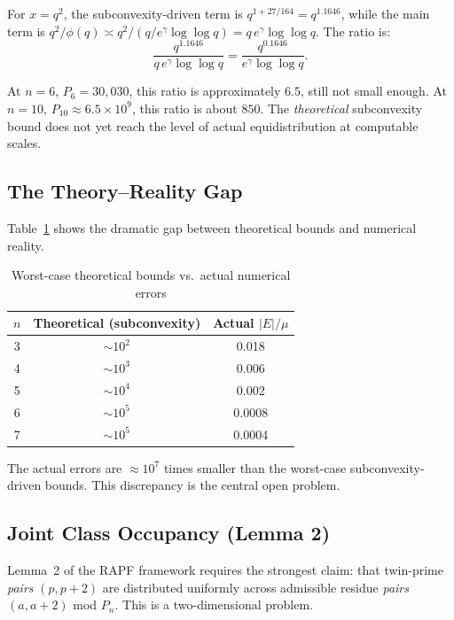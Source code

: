\documentclass[11pt]{article}
\begin{document}
For $x = q^2$, the subconvexity-driven term is $q^{1 + 27/164} = q^{1.1646}$,
while the main term is $q^2/\phi(q) \asymp q^2/(q/e^\gamma\log\log q) =
q\,e^\gamma\log\log q$. The ratio is:
\begin{equation}
\frac{q^{1.1646}}{q\,e^\gamma\log\log q} = \frac{q^{0.1646}}{e^\gamma
\log\log q}.
\end{equation}

At $n=6$, $P_6 = 30{,}030$, this ratio is approximately $6.5$, still not
small enough. At $n=10$, $P_{10} \approx 6.5 \times 10^9$, this ratio is
about $850$. The \emph{theoretical} subconvexity bound does not yet reach
the level of actual equidistribution at computable scales.

\subsection{The Theory--Reality Gap}

Table~\ref{tab:theory_reality} shows the dramatic gap between theoretical
bounds and numerical reality.

\begin{table}[h]
\centering
\caption{Worst-case theoretical bounds vs.\ actual numerical errors}
\label{tab:theory_reality}
\begin{tabular}{ccc}
\toprule
$n$ & Theoretical (subconvexity) & Actual $|E|/\mu$ \\
\midrule
3 & $\sim 10^2$ & 0.018 \\
4 & $\sim 10^3$ & 0.006 \\
5 & $\sim 10^4$ & 0.002 \\
6 & $\sim 10^5$ & 0.0008 \\
7 & $\sim 10^5$ & 0.0004 \\
\bottomrule
\end{tabular}
\end{table}

The actual errors are $\approx 10^7$ times smaller than the worst-case
subconvexity-driven bounds. This discrepancy is the central open problem.

\subsection{Joint Class Occupancy (Lemma 2)}

Lemma~2 of the RAPF framework requires the strongest claim: that twin-prime
\emph{pairs} $(p, p+2)$ are distributed uniformly across admissible residue
\emph{pairs} $(a, a+2)$ mod $P_n$. This is a two-dimensional problem.
\end{document}
